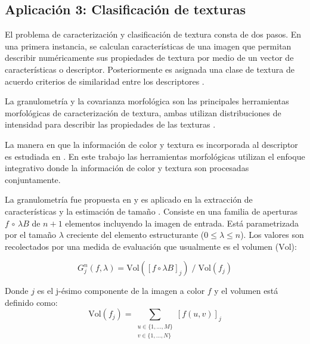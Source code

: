 \subsection{Aplicación 3: Clasificación de texturas}

 El problema de caracterización y clasificación de textura consta de dos pasos. En una primera instancia, se calculan características de una imagen que permitan describir numéricamente sus propiedades de textura por medio de un vector de características o descriptor. Posteriormente es asignada una clase de textura de acuerdo criterios de similaridad entre los descriptores \cite{hanbury2005illumination}.

La granulometría y la covarianza morfológica son las principales herramientas morfológicas de caracterización de textura, ambas utilizan distribuciones de intensidad para describir las propiedades de las texturas \cite{lefevre2009beyond}.


La manera en que la información de color y textura es incorporada al descriptor es estudiada en \cite{palm2004color,van2005parallel}. En este trabajo las herramientas morfológicas utilizan el enfoque integrativo donde la información de color y textura son procesadas conjuntamente.

La granulometría fue propuesta en \cite{matheron1975random} y es aplicado en la extracción de características y la estimación de tamaño \cite{vincent2000granulometries,soille2013morphological}. Consiste en una familia de aperturas $f \,\circ \, \lambda B $ de $n+1$ elementos incluyendo la imagen de entrada. Está parametrizada por el tamaño $\lambda$ creciente del elemento estructurante ($0 \leq \lambda \leq n $). Los valores son recolectados por una medida de evaluación que usualmente es el volumen ($\mathrm{Vol}$):

\begin{equation}
G^{n}_{j}(f,\lambda)= \mathrm{Vol}([f\circ \lambda B ]_{j}) \; / \; \mathrm{Vol}(f_{j})
\end{equation}

Donde $j$ es el j-ésimo componente de la imagen a color $f$ y el volumen está definido como:
\begin{equation}
\mathrm{Vol}(f_j) = \sum_{\substack{u\in \{1, ..., M\}\\ v \in \{1, ..., N\}}}[f(u,v)]_{j} 
\end{equation}

